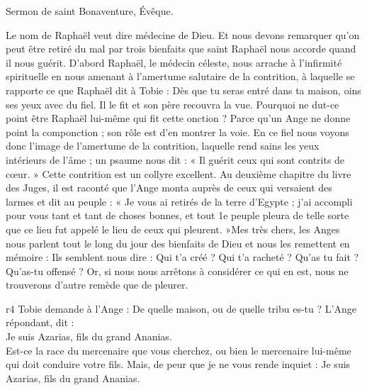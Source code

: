 \documentclass[twoside]{article}
\begin{document}
\begin{paracol}[1]{2}
{	}
	{
		
		Sermon de saint Bonaventure, Évêque.
		
		Le nom de Raphaël veut dire médecine de Dieu. Et nous devons remarquer qu’on peut être retiré du mal par trois bienfaits que saint Raphaël nous accorde quand il nous guérit. D’abord Raphaël, le médecin céleste, nous arrache à l’infirmité spirituelle en nous amenant à l’amertume salutaire de la contrition, à laquelle se rapporte ce que Raphaël dit à Tobie : Dès que tu seras entré dans ta maison, oins ses yeux avec du fiel. Il le fit et son père recouvra la vue. Pourquoi ne dut-ce point être Raphaël lui-même qui fit cette onction ? Parce qu’un Ange ne donne point la componction ; son rôle est d’en montrer la voie. En ce fiel nous voyons donc l’image de l’amertume de la contrition, laquelle rend sains les yeux intérieurs de l’âme ; un psaume nous dit : « Il guérit ceux qui sont contrits de cœur. » Cette contrition est un collyre excellent. Au deuxième chapitre du livre des Juges, il est raconté que l’Ange monta auprès de ceux qui versaient des larmes et dit au peuple : « Je vous ai retirés de la terre d’Egypte ; j’ai accompli pour vous tant et tant de choses bonnes, et tout 1e peuple pleura de telle sorte que ce lieu fut appelé le lieu de ceux qui pleurent. »Mes très chers, les Anges nous parlent tout le long du jour des bienfaits de Dieu et nous les remettent en mémoire : Ils semblent nous dire : Qui t’a créé ? Qui t’a racheté ? Qu’as tu fait ? Qu’as-tu offensé ? Or, si nous nous arrêtons à considérer ce qui en est, nous ne trouverons d’autre remède que de pleurer.
	}
	{r4}
	{\rr Tobie demande à l’Ange : De quelle maison, ou de quelle tribu es-tu ? L’Ange répondant, dit :\\
	\GreSpecial{*} Je suis Azarias, fils du grand Ananias.\\
	\vv Est-ce la race du mercenaire que vous cherchez, ou bien le mercenaire lui-même qui doit conduire votre fils. Mais, de peur que je ne vous rende inquiet :
	\rr Je suis Azarias, fils du grand Ananias.}


\end{paracol}
\end{document}
